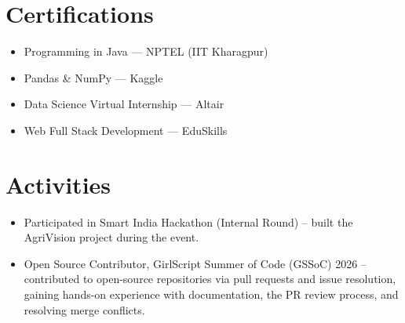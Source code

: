 \documentclass[letterpaper,11pt]{article}
\newcommand{\resumeCompactPlain}[1]{
  \item\small{#1}
}
\newcommand{\resumeSubHeadingListStart}{\begin{itemize}[leftmargin=*, itemsep=4pt, parsep=0pt, topsep=1pt]}
\newcommand{\resumeSubHeadingListEnd}{\end{itemize}}
\newenvironment{bulletcol}{
  \begin{itemize}[leftmargin=14pt, label={\color{bulletblue}\textbullet}, itemsep=2pt, topsep=1pt, parsep=0pt]
}{
  \end{itemize}
}
\begin{document}
\section{Certifications}
\begin{bulletcol}
\small
\item Programming in Java --- NPTEL (IIT Kharagpur)
\item Pandas \& NumPy --- Kaggle
\item Data Science Virtual Internship --- Altair
\item Web Full Stack Development --- EduSkills
\end{bulletcol}

\section{Activities}
\resumeSubHeadingListStart
  \resumeCompactPlain{Participated in Smart India Hackathon (Internal Round) -- built the AgriVision project during the event.}
  \resumeCompactPlain{Open Source Contributor, GirlScript Summer of Code (GSSoC) 2026 -- contributed to open-source repositories via pull requests and issue resolution, gaining hands-on experience with documentation, the PR review process, and resolving merge conflicts.}
\resumeSubHeadingListEnd
\end{document}
